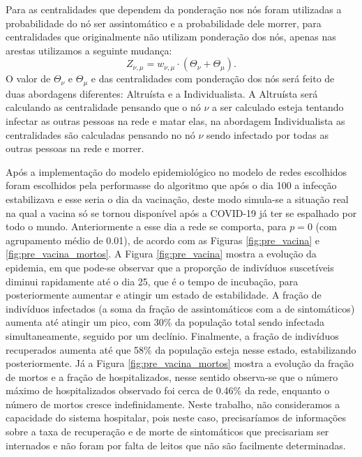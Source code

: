 Para as centralidades que dependem da ponderação nos nós foram utilizadas a probabilidade do nó ser assintomático e a probabilidade dele morrer, para centralidades que originalmente não utilizam ponderação dos nós, apenas nas arestas utilizamos a seguinte mudança:
\begin{equation}
    Z_{\nu,\mu} = w_{\nu,\mu}\cdot(\Theta_\nu + \Theta_\mu).
\end{equation}
O valor de $\Theta_\nu$ e $\Theta_\mu$ e das centralidades com ponderação dos nós será feito de duas abordagens diferentes: Altruísta e a Individualista. A Altruísta será calculando as centralidade pensando que o nó $\nu$ a ser calculado esteja tentando infectar as outras pessoas na rede e matar elas, na abordagem Individualista as centralidades são calculadas pensando no nó $\nu$ sendo infectado por todas as outras pessoas na rede e morrer.

Após a implementação do modelo epidemiológico no modelo de redes escolhidos foram escolhidos pela performasse do algoritmo que após o dia 100 a infecção estabilizava e esse seria o dia da vacinação, deste modo simula-se a situação real na qual a vacina só se tornou disponível após a COVID-19 já ter se espalhado por todo o mundo. Anteriormente a esse dia a rede se comporta, para $p = 0$ (com agrupamento médio de 0.01), de acordo com as Figuras \ref{fig:pre_vacina} e \ref{fig:pre_vacina_mortos}. A Figura \ref{fig:pre_vacina} mostra a evolução da epidemia, em que pode-se observar que a proporção de indivíduos suscetíveis diminui rapidamente até o dia 25, que é o tempo de incubação, para posteriormente aumentar e atingir um estado de estabilidade. A fração de indivíduos infectados (a soma da fração de assintomáticos com a de sintomáticos) aumenta até atingir um pico, com  30\% da população total sendo infectada simultaneamente, seguido por um declínio. Finalmente, a fração de indivíduos recuperados aumenta até que 58\% da população esteja nesse estado, estabilizando posteriormente. Já a Figura \ref{fig:pre_vacina_mortos} mostra a evolução  da  fração de mortos e a fração de hospitalizados, nesse sentido observa-se que o número máximo de hospitalizados observado foi cerca de 0.46\% da rede, enquanto o número de mortos cresce indefinidamente. Neste trabalho, não consideramos a capacidade do sistema hospitalar, pois neste caso, precisaríamos de informações sobre a taxa de recuperação e de morte de sintomáticos que precisariam ser internados e não foram por falta de leitos que não são facilmente determinadas.   

